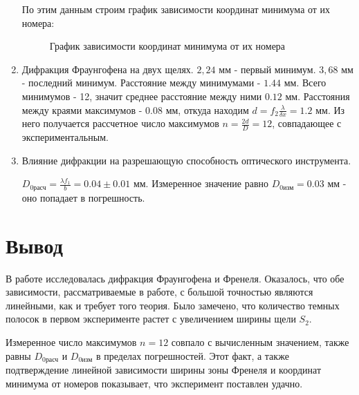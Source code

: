 \documentclass[a4paper,12pt]{article}
\theoremstyle{plain} %
\theoremstyle{definition} %
\theoremstyle{remark} %
\begin{document}
\begin{enumerate}
 По этим данным строим график зависимости координат минимума от их номера:
 
 \begin{figure}[h!]
 	\caption{График зависимости координат минимума от их номера}
 \end{figure}
 
 
 \item Дифракция Фраунгофена на двух щелях.
 $2,24$ мм - первый минимум. $3,68$ мм - последний минимум. Расстояние между минимумами - $1.44$ мм. Всего минимумов - 12, значит среднее расстояние между ними $0.12$ мм. Расстояния между краями максимумов - $0.08$ мм, откуда находим $d = f_2\frac{\lambda}{\delta x} =1.2$ мм. Из него получается рассчетное число максимумов $n =\frac{2d}{D}= 12$, совпадающее с экспериментальным.
 
 \item Влияние дифракции на разрешающую способность оптического инструмента.
 
 $D_{0\text{расч}} = \frac{\lambda f_1}{b} = 0.04 \pm 0.01$ мм. Измеренное значение равно 
 $D_{0\text{изм}} = 0.03$ мм - оно попадает в погрешность.
 
\end{enumerate}

\section{Вывод}
В работе исследовалась дифракция Фраунгофена и Френеля. Оказалось, что обе зависимости, рассматриваемые в работе, с большой точностью являются линейными, как и требует того теория. Было замечено, что количество темных полосок в первом эксперименте растет с увеличением ширины щели $S_2$.

Измеренное число максимумов $n=12$ совпало с вычисленным значением, также равны  $D_{0\text{расч}}$ и  $D_{0\text{изм}}$ в пределах погрешностей. Этот факт, а также подтверждение линейной зависимости ширины зоны Френеля и координат минимума от номеров показывает, что эксперимент поставлен удачно.
\end{document}
